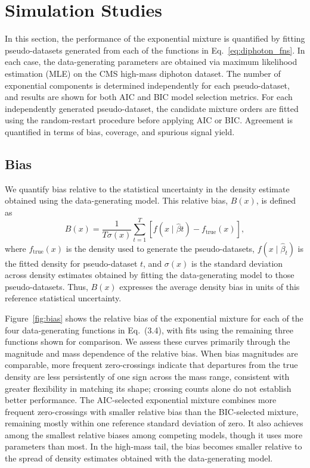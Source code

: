 \documentclass[a4paper,11pt]{article}
\begin{document}
\section{Simulation Studies}\label{sec:toys}

In this section, the performance of the exponential mixture is quantified by fitting pseudo-datasets generated from each of the functions in Eq.~\eqref{eq:diphoton_fns}. In each case, the data-generating parameters are obtained via maximum likelihood estimation (MLE) on the CMS high-mass diphoton dataset. The number of exponential components is determined independently for each pseudo-dataset, and results are shown for both AIC and BIC model selection metrics. For each independently generated pseudo-dataset, the candidate mixture orders are fitted using the random-restart procedure before applying AIC or BIC. Agreement is quantified in terms of bias, coverage, and spurious signal yield.

\subsection*{Bias}

We quantify bias relative to the statistical uncertainty in the density estimate obtained using the data-generating model. This relative bias, $B(x)$, is defined as
\begin{equation}
B(x)=\frac{1}{T\sigma(x)}
\sum_{t=1}^{T}\left[f(x\mid\hat{\beta}t)-f_{\mathrm{true}}(x)\right],
\end{equation}
where $f_{\mathrm{true}}(x)$ is the density used to generate the pseudo-datasets, $f(x\mid\hat{\beta}_t)$ is the fitted density for pseudo-dataset $t$, and $\sigma(x)$ is the standard deviation across density estimates obtained by fitting the data-generating model to those pseudo-datasets. Thus, $B(x)$ expresses the average density bias in units of this reference statistical uncertainty.

Figure~\ref{fig:bias} shows the relative bias of the exponential mixture for each of the four data-generating functions in Eq.~(3.4), with fits using the remaining three functions shown for comparison. We assess these curves primarily through the magnitude and mass dependence of the relative bias. When bias magnitudes are comparable, more frequent zero-crossings indicate that departures from the true density are less persistently of one sign across the mass range, consistent with greater flexibility in matching its shape; crossing counts alone do not establish better performance. The AIC-selected exponential mixture combines more frequent zero-crossings with smaller relative bias than the BIC-selected mixture, remaining mostly within one reference standard deviation of zero. It also achieves among the smallest relative biases among competing models, though it uses more parameters than most. In the high-mass tail, the bias becomes smaller relative to the spread of density estimates obtained with the data-generating model.
\end{document}
